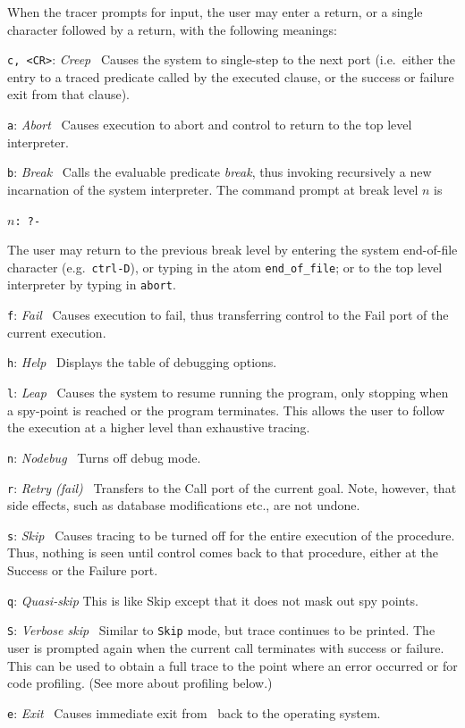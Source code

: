 \begin{description}
When the tracer prompts for input, the user may enter a return, or a single
character followed by a return, with the following meanings:
\bi
{}
\item{\tt c, <CR>}: {\em Creep}~ Causes the system to single-step to
  the next port (i.e.\ either the entry to a traced predicate called
  by the executed clause, or the success or failure exit from that
  clause).
\item{\tt a}: {\em Abort}~  Causes execution to abort
  and control to return to the top level interpreter.
\item{\tt b}: {\em Break}~ Calls the evaluable predicate {\em break},
  thus invoking recursively a new incarnation of the system
  interpreter.  The command prompt at break level $n$ is
  \begin{center}
    {\tt $n$: \tt ?-}
  \end{center}
  The user may return to the previous break level by entering the system
  end-of-file character (e.g.\ {\tt ctrl-D}), or typing in the atom 
  {\tt end\_of\_file}; or to the top level interpreter by typing in
  {\tt abort}.
\item{\tt f}: {\em Fail}~ Causes execution to fail, thus transferring
  control to the Fail port of the current execution.
\item{\tt h}: {\em Help}~ Displays the table of debugging options.
\item{\tt l}: {\em Leap}~ Causes the system to resume running the
  program, only stopping when a spy-point is reached or the program
  terminates.  This allows the user to follow the execution at a
  higher level than exhaustive tracing.
\item{\tt n}: {\em Nodebug}~ Turns off debug mode.
\item{\tt r}: {\em Retry (fail)}~ Transfers to the Call port of the current
  goal.  Note, however, that side effects, such as database modifications
  etc., are not undone.
\item{\tt s}: {\em Skip}~ Causes tracing to be turned off for the entire
  execution of the procedure.  Thus, nothing is seen until control comes
  back to that procedure, either at the Success or the Failure port.
\item{\tt q}: {\em Quasi-skip} This is like Skip except that it does not mask
  out spy points.
\item{\tt S}: {\em Verbose skip}~ Similar to {\tt Skip} mode, but trace
  continues to be printed. The user is prompted again when the current call
  terminates with success or failure.  This can be used to obtain a full
  trace to the point where an error occurred or for code profiling. (See
  more about profiling below.)
\item{\tt e}: {\em Exit}~ Causes immediate exit from \ourprolog\ back to the
  operating system.
\ei


\end{description}
